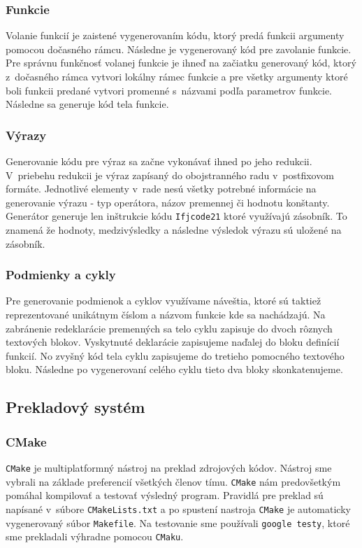 \documentclass[a4paper, 11pt]{article}
\begin{document}
    \subsubsection{Funkcie}
    Volanie funkcií je zaistené vygenerovaním kódu, ktorý predá funkcii argumenty pomocou dočasného rámcu. Následne
    je vygenerovaný kód pre zavolanie funkcie. Pre správnu funkčnosť volanej funkcie je ihneď na začiatku generovaný kód,
    ktorý z~dočasného rámca vytvori lokálny rámec funkcie a pre všetky argumenty ktoré boli funkcii predané vytvori
    promenné s~názvami podľa parametrov funkcie. Následne sa generuje kód tela funkcie.

    \subsubsection{Výrazy}
    Generovanie kódu pre výraz sa začne vykonávať ihned po jeho redukcii. V~priebehu redukcii je výraz zapísaný do obojstranného radu
    v~postfixovom formáte. Jednotlivé elementy v~rade nesú všetky potrebné
    informácie na generovanie výrazu - typ operátora, názov premennej či hodnotu konštanty. Generátor generuje len inštrukcie
    kódu \texttt{Ifjcode21} ktoré využívajú zásobník. To znamená že hodnoty, medzivýsledky a následne výsledok výrazu sú
    uložené na zásobník.

    \subsubsection{Podmienky a cykly}
    Pre generovanie podmienok a cyklov využívame náveštia, ktoré sú taktiež reprezentované unikátnym číslom a
    názvom funkcie kde sa nachádzajú. Na zabránenie redeklarácie premenných sa telo cyklu zapisuje do dvoch rôznych textových
    blokov. Vyskytnuté deklarácie zapisujeme naďalej do bloku definícií funkcií. No zvyšný kód tela cyklu zapisujeme do
    tretieho pomocného textového bloku. Následne po vygenerovaní celého cyklu tieto dva bloky skonkatenujeme.

    \subsection{Prekladový systém}
    \subsubsection{CMake}
    \texttt{CMake} je multiplatformný nástroj na preklad zdrojových kódov. Nástroj sme vybrali na základe preferencií všetkých
    členov tímu. \texttt{CMake} nám predovšetkým pomáhal kompilovať a testovať výsledný program. Pravidlá pre preklad sú napísané v~súbore
    \texttt{CMakeLists.txt} a po spustení nastroja \texttt{CMake} je automaticky vygenerovaný súbor \texttt{Makefile}.
    Na testovanie sme používali \texttt{google testy}, ktoré sme prekladali výhradne pomocou \texttt{CMaku}.
\end{document}

